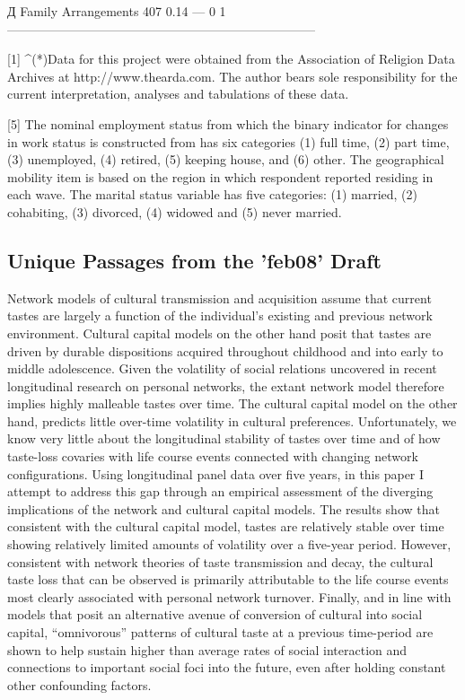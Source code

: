 Д Family Arrangements                   407   0.14    ---      0     1   --------------------------------------------------------------------------

[1] ^(*)Data for this project were obtained from the Association of Religion Data Archives at http://www.thearda.com. The author bears sole responsibility for the current interpretation, analyses and tabulations of these data.

[5] The nominal employment status from which the binary indicator for changes in work status is constructed from has six categories (1) full time, (2) part time, (3) unemployed, (4) retired, (5) keeping house, and (6) other. The geographical mobility item is based on the region in which respondent reported residing in each wave. The marital status variable has five categories: (1) married, (2) cohabiting, (3) divorced, (4) widowed and (5) never married.

\subsection*{Unique Passages from the 'feb08' Draft}
Network models of cultural transmission and acquisition assume that current tastes are largely a function of the individual’s existing and previous network environment. Cultural capital models on the other hand posit that tastes are driven by durable dispositions acquired throughout childhood and into early to middle adolescence. Given the volatility of social relations uncovered in recent longitudinal research on personal networks, the extant network model therefore implies highly malleable tastes over time. The cultural capital model on the other hand, predicts little over-time volatility in cultural preferences. Unfortunately, we know very little about the longitudinal stability of tastes over time and of how taste-loss covaries with life course events connected with changing network configurations. Using longitudinal panel data over five years, in this paper I attempt to address this gap through an empirical assessment of the diverging implications of the network and cultural capital models. The results show that consistent with the cultural capital model, tastes are relatively stable over time showing relatively limited amounts of volatility over a five-year period. However, consistent with network theories of taste transmission and decay, the cultural taste loss that can be observed is primarily attributable to the life course events most clearly associated with personal network turnover. Finally, and in line with models that posit an alternative avenue of conversion of cultural into social capital, “omnivorous” patterns of cultural taste at a previous time-period are shown to help sustain higher than average rates of social interaction and connections to important social foci into the future, even after holding constant other confounding factors.

